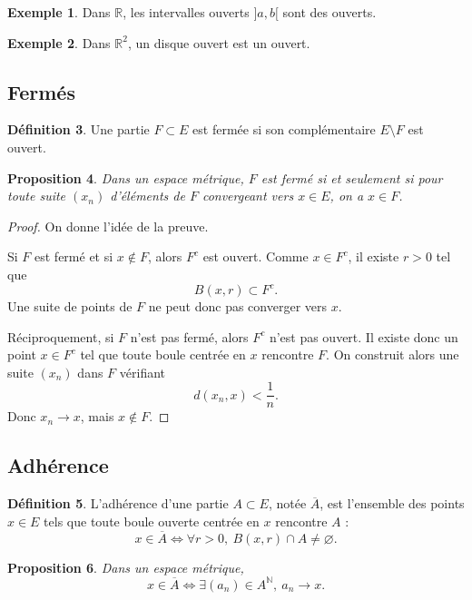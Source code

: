 \documentclass[11pt,a4paper]{article}
\theoremstyle{definition}
\newtheorem{definition}{Définition}[section]
\newtheorem{exemple}[definition]{Exemple}
\theoremstyle{plain}
\newtheorem{proposition}[definition]{Proposition}
\newcommand{\R}{\mathbb{R}}
\newcommand{\N}{\mathbb{N}}
\begin{document}
\begin{exemple}
Dans $\R$, les intervalles ouverts $]a,b[$ sont des ouverts.
\end{exemple}

\begin{exemple}
Dans $\R^2$, un disque ouvert est un ouvert.
\end{exemple}

\subsection{Fermés}

\begin{definition}
Une partie $F\subset E$ est fermée si son complémentaire $E\setminus F$ est ouvert.
\end{definition}

\begin{proposition}
Dans un espace métrique, $F$ est fermé si et seulement si pour toute suite $(x_n)$ d'éléments de $F$ convergeant vers $x\in E$, on a $x\in F$.
\end{proposition}

\begin{proof}
On donne l'idée de la preuve.

Si $F$ est fermé et si $x\notin F$, alors $F^c$ est ouvert. Comme $x\in F^c$, il existe $r>0$ tel que
\[
B(x,r)\subset F^c.
\]
Une suite de points de $F$ ne peut donc pas converger vers $x$.

Réciproquement, si $F$ n'est pas fermé, alors $F^c$ n'est pas ouvert. Il existe donc un point $x\in F^c$ tel que toute boule centrée en $x$ rencontre $F$. On construit alors une suite $(x_n)$ dans $F$ vérifiant
\[
d(x_n,x)<\frac1n.
\]
Donc $x_n\to x$, mais $x\notin F$.
\end{proof}

\subsection{Adhérence}

\begin{definition}
L'adhérence d'une partie $A\subset E$, notée $\overline A$, est l'ensemble des points $x\in E$ tels que toute boule ouverte centrée en $x$ rencontre $A$ :
\[
x\in\overline A
\Longleftrightarrow
\forall r>0,\ B(x,r)\cap A\neq \varnothing.
\]
\end{definition}

\begin{proposition}
Dans un espace métrique,
\[
x\in\overline A
\Longleftrightarrow
\exists (a_n)\in A^\N,\ a_n\to x.
\]
\end{proposition}
\end{document}
